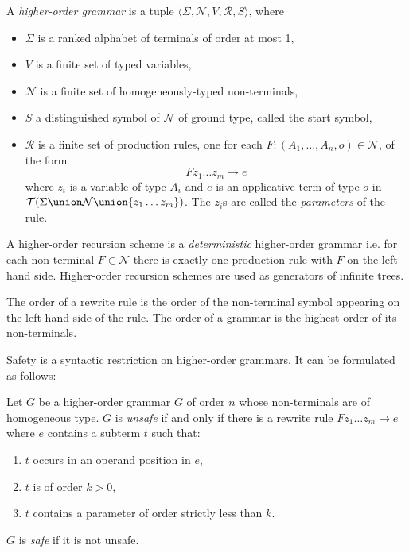 \begin{definition}
A \emph{higher-order grammar} is a tuple $\langle \Sigma,
\mathcal{N}, V, \mathcal{R}, S \rangle$, where
\begin{itemize}
\item $\Sigma$ is a ranked alphabet of terminals of order at most 1,
\item $V$ is a finite set of typed variables,
\item $\mathcal{N}$ is a finite set of homogeneously-typed non-terminals,
\item $S$ a distinguished symbol of $\mathcal{N}$ of ground type, called the start symbol,
\item $\mathcal{R}$ is a finite set of production rules, one for each $F : (A_1, \ldots, A_n, o) \in \mathcal{N}$, of the form
    $$ F z_1 \ldots z_m \rightarrow e$$
where $z_i$ is a variable of type $A_i$ and $e$ is an applicative
term of type $o$ in $\mathcal{T}(\Sigma \union \mathcal{N} \union
\{z_1 \ldots z_m \} )$. The $z_i$s are called the \emph{parameters}
of the rule.
\end{itemize}
\end{definition}
A higher-order recursion scheme is a \emph{deterministic} higher-order grammar i.e. for each non-terminal $F \in \mathcal{N}$ there is exactly one production rule with $F$ on the left hand side.
Higher-order recursion schemes are used as generators
of infinite trees.

The order of a rewrite rule is the order of the non-terminal symbol
appearing on the left hand side of the rule. The order of a grammar
is the highest order of its non-terminals.

Safety is a syntactic restriction on higher-order grammars. It can be formulated as
follows:
\begin{definition}
  Let $G$ be a higher-order grammar $G$ of order $n$
    whose non-terminals are of homogeneous type.
    $G$ is \emph{unsafe} if and only if there is a rewrite rule $F z_1 \ldots z_m \rightarrow e$ where
   $e$ contains a subterm $t$ such that:
  \begin{enumerate}
    \item $t$ occurs in an operand position in $e$,
    \item $t$ is of order $k>0$,
    \item $t$ contains a parameter of order strictly less than $k$.
  \end{enumerate}
  $G$ is \emph{safe} if it is not unsafe.
\end{definition}

